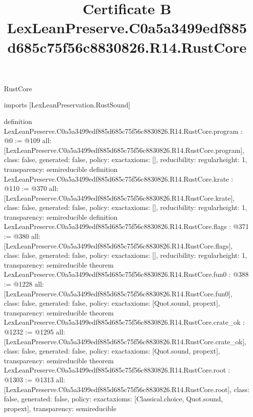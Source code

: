 \begin{lexlean}{RustCore}
\title{Certificate B LexLeanPreserve.C0a5a3499edf885d685c75f56c8830826.R14.RustCore}
\begin{coremodule}
imports [LexLeanPreservation.RustSound]

definition LexLeanPreserve.C0a5a3499edf885d685c75f56c8830826.R14.RustCore.program : @0 := @109 {
  all: [LexLeanPreserve.C0a5a3499edf885d685c75f56c8830826.R14.RustCore.program],
  class: false,
  generated: false,
  policy: exact{axioms: []},
  reducibility: regular{height: 1},
  transparency: semireducible
}
definition LexLeanPreserve.C0a5a3499edf885d685c75f56c8830826.R14.RustCore.krate : @110 := @370 {
  all: [LexLeanPreserve.C0a5a3499edf885d685c75f56c8830826.R14.RustCore.krate],
  class: false,
  generated: false,
  policy: exact{axioms: []},
  reducibility: regular{height: 1},
  transparency: semireducible
}
definition LexLeanPreserve.C0a5a3499edf885d685c75f56c8830826.R14.RustCore.flags : @371 := @380 {
  all: [LexLeanPreserve.C0a5a3499edf885d685c75f56c8830826.R14.RustCore.flags],
  class: false,
  generated: false,
  policy: exact{axioms: []},
  reducibility: regular{height: 1},
  transparency: semireducible
}
theorem LexLeanPreserve.C0a5a3499edf885d685c75f56c8830826.R14.RustCore.fun0 : @388 := @1228 {
  all: [LexLeanPreserve.C0a5a3499edf885d685c75f56c8830826.R14.RustCore.fun0],
  class: false,
  generated: false,
  policy: exact{axioms: [Quot.sound, propext]},
  transparency: semireducible
}
theorem LexLeanPreserve.C0a5a3499edf885d685c75f56c8830826.R14.RustCore.crate_ok : @1232 := @1295 {
  all: [LexLeanPreserve.C0a5a3499edf885d685c75f56c8830826.R14.RustCore.crate_ok],
  class: false,
  generated: false,
  policy: exact{axioms: [Quot.sound, propext]},
  transparency: semireducible
}
theorem LexLeanPreserve.C0a5a3499edf885d685c75f56c8830826.R14.RustCore.root : @1303 := @1313 {
  all: [LexLeanPreserve.C0a5a3499edf885d685c75f56c8830826.R14.RustCore.root],
  class: false,
  generated: false,
  policy: exact{axioms: [Classical.choice, Quot.sound, propext]},
  transparency: semireducible
}


\end{coremodule}
\end{lexlean}
